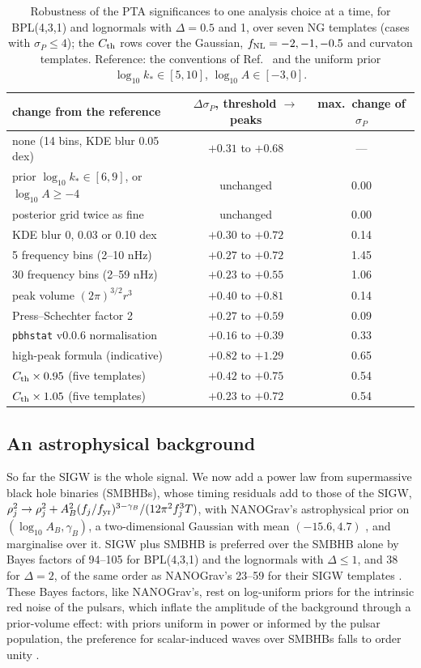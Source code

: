 \documentclass{article}
\newcommand{\fnl}{f_{\rm NL}}
\begin{document}
\begin{table}[t]
\caption{Robustness of the PTA significances to one analysis choice at a time, for BPL(4,3,1)
and lognormals with $\Delta=0.5$ and 1, over seven NG templates (cases with $\sigma_P\le4$); the
$C_{\rm th}$ rows cover the Gaussian, $\fnl=-2,-1,-0.5$ and curvaton templates. Reference: the
conventions of Ref.~\cite{FIVT23} and the uniform prior $\log_{10}k_*\in[5,10]$,
$\log_{10}A\in[-3,0]$.}
\label{tab:robust}
\centering\small
\begin{tabular}{lcc}
\toprule
change from the reference & $\Delta\sigma_P$, threshold $\to$ peaks & max.\ change of $\sigma_P$\\
\midrule
none (14 bins, KDE blur 0.05 dex) & $+0.31$ to $+0.68$ & ---\\
prior $\log_{10}k_*\in[6,9]$, or $\log_{10}A\ge-4$ & unchanged & 0.00\\
posterior grid twice as fine & unchanged & 0.00\\
KDE blur 0, 0.03 or 0.10 dex & $+0.30$ to $+0.72$ & 0.14\\
5 frequency bins (2--10 nHz) & $+0.27$ to $+0.72$ & 1.45\\
30 frequency bins (2--59 nHz) & $+0.23$ to $+0.55$ & 1.06\\
peak volume $(2\pi)^{3/2}r^3$ & $+0.40$ to $+0.81$ & 0.14\\
Press--Schechter factor 2 & $+0.27$ to $+0.59$ & 0.09\\
\texttt{pbhstat} v0.0.6 normalisation & $+0.16$ to $+0.39$ & 0.33\\
high-peak formula \cite{Iovino24} (indicative) & $+0.82$ to $+1.29$ & 0.65\\
$C_{\rm th}\times0.95$ (five templates) & $+0.42$ to $+0.75$ & 0.54\\
$C_{\rm th}\times1.05$ (five templates) & $+0.23$ to $+0.72$ & 0.54\\
\bottomrule
\end{tabular}
\end{table}

\subsection{An astrophysical background}\label{sec:smbhb}

So far the SIGW is the whole signal. We now add a power law from supermassive black hole binaries
(SMBHBs), whose timing residuals add to those of the SIGW,
$\rho_j^2\to\rho_j^2+A_B^2(f_j/f_{\rm yr})^{3-\gamma_B}/(12\pi^2f_j^3T)$, with NANOGrav's
astrophysical prior on $(\log_{10}A_B,\gamma_B)$, a two-dimensional Gaussian with mean
$(-15.6,4.7)$ \cite{NG15np}, and marginalise over it. SIGW plus SMBHB is preferred over the SMBHB
alone by Bayes factors of 94--105 for BPL(4,3,1) and the lognormals with $\Delta\le1$, and 38 for
$\Delta=2$, of the same order as NANOGrav's 23--59 for their SIGW templates \cite{NG15np}. These
Bayes factors, like NANOGrav's, rest on log-uniform priors for the intrinsic red noise of the
pulsars, which inflate the amplitude of the background through a prior-volume effect: with priors
uniform in power or informed by the pulsar population, the preference for scalar-induced waves over
SMBHBs falls to order unity \cite{DZA26}.
\end{document}
